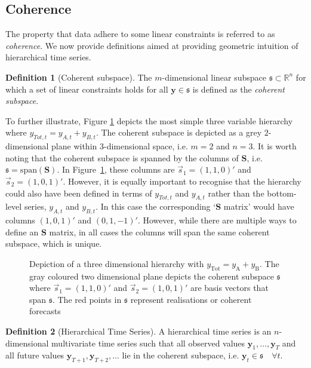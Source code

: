 \documentclass[12pt]{article}
\theoremstyle{definition}
\newtheorem{definition}{Definition}[section]
\theoremstyle{property}
\begin{document}
	\subsection{Coherence}\label{sec:cohpointf}
	
	The property that data adhere to some linear constraints is referred to as {\em coherence}.  We now provide definitions aimed at providing geometric intuition of hierarchical time series.
	
	 \begin{definition}[Coherent subspace]\label{def:cohspace}
	 	The $m$-dimensional linear subspace $\mathfrak{s}\subset \mathbb{R}^n$ for which a set of linear constraints holds for all $\bm{y}\in\mathfrak{s}$ is defined as the \emph{coherent subspace}.
	 \end{definition}
     To further illustrate, Figure \ref{fig:3D_hierarchy} depicts the most simple three variable hierarchy where $y_{Tot,t}=y_{A,t}+y_{B,t}$.  The coherent subspace is depicted as a grey $2$-dimensional plane within $3$-dimensional space, i.e. $m=2$ and $n=3$.  It is worth noting that the coherent subspace is spanned by the columns of $\bm{S}$, i.e.\ $\mathfrak{s}=\text{span}(\bm{S})$.  In Figure~\ref{fig:3D_hierarchy}, these columns are $\vec{s}_1=(1,1,0)'$ and $\vec{s}_2=(1,0,1)'$.  However, it is equally important to recognise that the hierarchy could also have been defined in terms of $y_{Tot,t}$ and $y_{A,t}$ rather than the bottom-level series, $y_{A,t}$ and $y_{B,t}$. In this case the corresponding `$\bm{S}$ matrix' would have columns $(1,0,1)'$ and $(0,1,-1)'$.  However, while there are multiple ways to define an $\bm{S}$ matrix, in all cases the columns will span the same coherent subspace, which is unique.

     \begin{figure}[H]
     	\centering
     	\vspace{-0.9cm}
     	\small
     	\resizebox{\linewidth}{!}{
     		
     	}
     	\caption{Depiction of a three dimensional hierarchy with $y_{\text{Tot}} = y_{\text{A}} + y_{\text{B}}$. The gray coloured two dimensional plane depicts the coherent subspace $\mathfrak{s}$ where $\vec{s}_1 = (1,1,0)'$ and $\vec{s}_2 = (1, 0, 1)'$ are basis vectors that span $\mathfrak{s}$. The red points in $\mathfrak{s}$ represent realisations or coherent forecasts}\label{fig:3D_hierarchy}
     \end{figure}

	 \begin{definition}[Hierarchical Time Series]\label{def:cohspace}
	 	A hierarchical time series is an $n$-dimensional multivariate time series such that all observed values $\bm{y}_1,\ldots,\bm{y}_T$ and all future values $\bm{y}_{T+1},\bm{y}_{T+2},\ldots$  lie in the coherent subspace, i.e. $\bm{y}_t\in\mathfrak{s}\quad\forall t$.
	 \end{definition}
\end{document}
